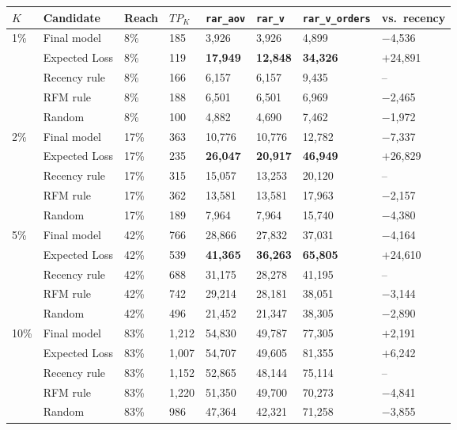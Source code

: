 \begin{center}
\footnotesize
\setlength{\tabcolsep}{4pt}
\begin{tabular}{@{}p{0.8cm}p{2.3cm}p{1cm}p{1.1cm}p{1.8cm}p{1.8cm}p{2.1cm}p{2.1cm}@{}}
    \toprule
    $K$ & Candidate & Reach & $TP_K$ & \texttt{rar\_aov} & \texttt{rar\_v} & \texttt{rar\_v\_orders} & vs.\ recency \\
    \midrule
    1\% & Final model & 8\% & 185 & 3,926 & 3,926 & 4,899 & $-$4,536 \\
     & Expected Loss & 8\% & 119 & \textbf{17,949} & \textbf{12,848} & \textbf{34,326} & $+$24,891 \\
     & Recency rule & 8\% & 166 & 6,157 & 6,157 & 9,435 & -- \\
     & RFM rule & 8\% & 188 & 6,501 & 6,501 & 6,969 & $-$2,465 \\
     & Random & 8\% & 100 & 4,882 & 4,690 & 7,462 & $-$1,972 \\
    \midrule
    2\% & Final model & 17\% & 363 & 10,776 & 10,776 & 12,782 & $-$7,337 \\
     & Expected Loss & 17\% & 235 & \textbf{26,047} & \textbf{20,917} & \textbf{46,949} & $+$26,829 \\
     & Recency rule & 17\% & 315 & 15,057 & 13,253 & 20,120 & -- \\
     & RFM rule & 17\% & 362 & 13,581 & 13,581 & 17,963 & $-$2,157 \\
     & Random & 17\% & 189 & 7,964 & 7,964 & 15,740 & $-$4,380 \\
    \midrule
    5\% & Final model & 42\% & 766 & 28,866 & 27,832 & 37,031 & $-$4,164 \\
     & Expected Loss & 42\% & 539 & \textbf{41,365} & \textbf{36,263} & \textbf{65,805} & $+$24,610 \\
     & Recency rule & 42\% & 688 & 31,175 & 28,278 & 41,195 & -- \\
     & RFM rule & 42\% & 742 & 29,214 & 28,181 & 38,051 & $-$3,144 \\
     & Random & 42\% & 496 & 21,452 & 21,347 & 38,305 & $-$2,890 \\
    \midrule
    10\% & Final model & 83\% & 1,212 & 54,830 & 49,787 & 77,305 & $+$2,191 \\
     & Expected Loss & 83\% & 1,007 & 54,707 & 49,605 & 81,355 & $+$6,242 \\
     & Recency rule & 83\% & 1,152 & 52,865 & 48,144 & 75,114 & -- \\
     & RFM rule & 83\% & 1,220 & 51,350 & 49,700 & 70,273 & $-$4,841 \\
     & Random & 83\% & 986 & 47,364 & 42,321 & 71,258 & $-$3,855 \\
    \bottomrule
\end{tabular}
\end{center}

